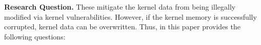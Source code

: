 {\bf Research Question.}
These mitigate the kernel data from being illegally modified via kernel
vulnerabilities.
However, if the kernel memory is successfully corrupted, kernel data can be
overwritten.
%
%
Thus, in this paper provides the following questions:
